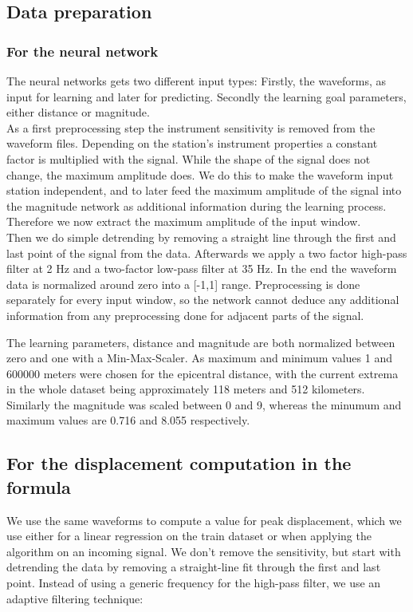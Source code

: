 \documentclass[thesis.tex]{subfiles}
\begin{document}
\subsection{Data preparation}
\subsubsection{For the neural network}
The neural networks gets two different input types: Firstly, the waveforms, as input for learning and later for predicting. Secondly the learning goal parameters, either distance or magnitude. \\
As a first preprocessing step the instrument sensitivity is removed from the waveform files. Depending on the station's instrument properties a constant factor is multiplied with the signal. While the shape of the signal does not change, the maximum amplitude does. We do this to make the waveform input station independent, and to later feed the maximum amplitude of the signal into the magnitude network as additional information during the learning process. Therefore we now extract the maximum amplitude of the input window.\\
Then we do simple detrending by removing a straight line through the first and last point of the signal from the data. Afterwards we apply a two factor high-pass filter at 2 Hz and a two-factor low-pass filter at 35 Hz. In the end the waveform data is normalized around zero into a [-1,1] range. 
Preprocessing is done separately for every input window, so the network cannot deduce any additional information from any preprocessing done for adjacent parts of the signal.

The learning parameters, distance and magnitude are both normalized between zero and one with a Min-Max-Scaler. As maximum and minimum values 1 and 600000 meters were chosen for the epicentral distance, with the current extrema in the whole dataset being approximately 118 meters and 512 kilometers.\\
Similarly the magnitude was scaled between 0 and 9, whereas the minumum and maximum values are 0.716 and 8.055 respectively.
\subsection{For the displacement computation in the formula} 
We use the same waveforms to compute a value for peak displacement, which we use either for a linear regression on the train dataset or when applying the algorithm on an incoming signal. We don't remove the sensitivity, but start with detrending the data by removing a straight-line fit through the first and last point. Instead of using a generic frequency for the high-pass filter, we use an adaptive filtering technique:
\end{document}
